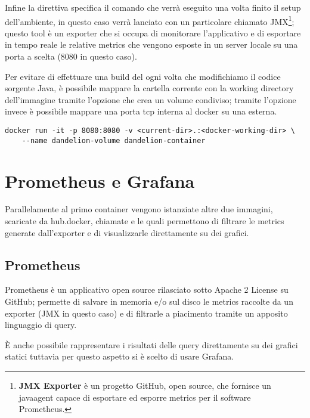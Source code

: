 Infine la direttiva  specifica il comando che verrà eseguito una volta finito il setup dell'ambiente, in questo caso verrà lanciato  con un particolare
 chiamato JMX\footnote{
    \textbf{JMX Exporter}\cite{jmx} è un progetto GitHub, open source, che fornisce un javaagent capace di esportare ed esporre metrics per il software 
    Prometheus\cite{prometheus}.
};
questo tool è un exporter che si occupa di monitorare l'applicativo e di esportare in tempo reale le relative metrics che vengono esposte in un server locale su una porta a scelta 
(8080 in questo caso).

Per evitare di effettuare una build del  ogni volta che modifichiamo il codice sorgente Java, è possibile mappare la cartella corrente con la working directory 
dell'immagine tramite l'opzione  che crea un volume condiviso; tramite l'opzione  invece è possibile mappare una porta tcp interna al docker su una esterna.

\begin{lstlisting}[style=YmlStyle, caption=Run Docker]
    docker run -it -p 8080:8080 -v <current-dir>.:<docker-working-dir> \
    --name dandelion-volume dandelion-container
\end{lstlisting}

\section{Prometheus e Grafana}
Parallelamente al primo container vengono istanziate altre due immagini, scaricate da hub.docker\cite{hub-docker}, chiamate \cite{docker-prometheus} 
e \code{grafana/grafana}\cite{docker-grafana} le quali permettono di filtrare le metrics generate dall'exporter e di visualizzarle direttamente su dei grafici. 

\subsection{Prometheus}
Prometheus\cite{prometheus} è un applicativo open source rilasciato sotto Apache 2 License su GitHub; permette di salvare in memoria e/o sul disco le metrics raccolte 
da un exporter (JMX in questo caso) e di filtrarle a piacimento tramite un apposito linguaggio di query. 

È anche possibile rappresentare i risultati delle query direttamente su dei grafici statici tuttavia per questo aspetto si è scelto di usare Grafana.

